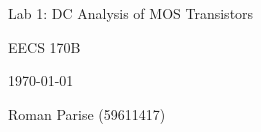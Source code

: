 \centering
\vspace{2.5cm}
{\huge Lab 1: DC Analysis of MOS Transistors \par}
{\Large EECS 170B \par}
{\Large \today \par}
\vspace{1cm}
{\large Roman Parise (59611417)\par}
\vspace{1cm}
